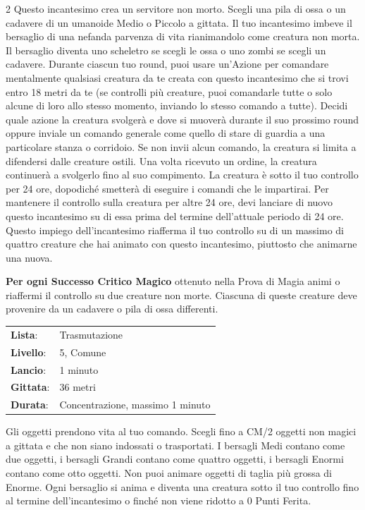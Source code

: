 \begin{multicols}{2}
Questo incantesimo crea un servitore non morto. Scegli una pila di ossa o un cadavere di un umanoide Medio o Piccolo a gittata. Il tuo incantesimo imbeve il bersaglio di una nefanda parvenza di vita rianimandolo come creatura non morta. Il bersaglio diventa uno scheletro se scegli le ossa o uno zombi se scegli un cadavere. Durante ciascun tuo round, puoi usare un'Azione per comandare mentalmente qualsiasi creatura da te creata con questo incantesimo che si trovi entro 18 metri da te (se controlli più creature, puoi comandarle tutte o solo alcune di loro allo stesso momento, inviando lo stesso comando a tutte). Decidi quale azione la creatura svolgerà e dove si muoverà durante il suo prossimo round oppure inviale un comando generale come quello di stare di guardia a una particolare stanza o corridoio. Se non invii alcun comando, la creatura si limita a difendersi dalle creature ostili. Una volta ricevuto un ordine, la creatura continuerà a svolgerlo fino al suo compimento. La creatura è sotto il tuo controllo per 24 ore, dopodiché smetterà di eseguire i comandi che le impartirai. Per mantenere il controllo sulla creatura per altre 24 ore, devi lanciare di nuovo questo incantesimo su di essa prima del termine dell'attuale periodo di 24 ore. Questo impiego dell'incantesimo riafferma il tuo controllo su di un massimo di quattro creature che hai animato con questo incantesimo, piuttosto che animarne una nuova.

\textbf{Per ogni Successo Critico Magico} ottenuto nella Prova di Magia animi o riaffermi il controllo su due creature non morte. Ciascuna di queste creature deve provenire da un cadavere o pila di ossa differenti.

\noindent\begin{tabularx}{\linewidth}{p{1.9cm}X}
	\rowcolor{gray!20}\textbf{Lista}: & Trasmutazione \\
	\textbf{Livello}: & 5, Comune \\
	\rowcolor{gray!20}\textbf{Lancio}: & 1 minuto \\
	\textbf{Gittata}: & 36 metri \\
	\rowcolor{gray!20}\textbf{Durata}: & Concentrazione, massimo 1 minuto \\
\end{tabularx}\smallskip

\label{Animate Object}Gli oggetti prendono vita al tuo comando. Scegli fino a CM/2 oggetti non magici a gittata e che non siano indossati o trasportati. I bersagli Medi contano come due oggetti, i bersagli Grandi contano come quattro oggetti, i bersagli Enormi contano come otto oggetti. Non puoi animare oggetti di taglia più grossa di Enorme. Ogni bersaglio si anima e diventa una creatura sotto il tuo controllo fino al termine dell'incantesimo o finché non viene ridotto a 0 Punti Ferita.


\end{multicols}
